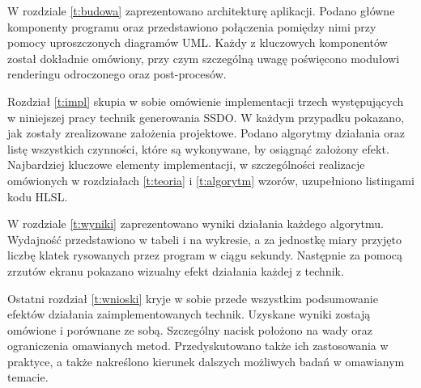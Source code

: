 	W rozdziale \ref{t:budowa} zaprezentowano architekturę aplikacji. Podano główne komponenty programu oraz przedstawiono połączenia pomiędzy nimi przy pomocy uproszczonych diagramów UML. Każdy z kluczowych komponentów został dokładnie omówiony, przy czym szczególną uwagę poświęcono modułowi renderingu odroczonego oraz post-procesów.
	
	Rozdział \ref{t:impl} skupia w sobie omówienie implementacji trzech występujących w niniejszej pracy technik generowania SSDO. W każdym przypadku pokazano, jak zostały zrealizowane założenia projektowe. Podano algorytmy działania oraz listę wszystkich czynności, które są wykonywane, by osiągnąć założony efekt. Najbardziej kluczowe elementy implementacji, w szczególności realizacje omówionych w rozdziałach \ref{t:teoria} i \ref{t:algorytm} wzorów, uzupełniono listingami kodu HLSL.
	
	W rozdziale \ref{t:wyniki} zaprezentowano wyniki działania każdego algorytmu. Wydajność przedstawiono w tabeli i na wykresie, a za jednostkę miary przyjęto liczbę klatek rysowanych przez program w ciągu sekundy. Następnie za pomocą zrzutów ekranu pokazano wizualny efekt działania każdej z technik.
	
	Ostatni rozdział \ref{t:wnioski} kryje w sobie przede wszystkim podsumowanie efektów działania zaimplementowanych technik. Uzyskane wyniki zostają omówione i porównane ze sobą. Szczególny nacisk położono na wady oraz ograniczenia omawianych metod. Przedyskutowano także ich zastosowania w praktyce, a także nakreślono kierunek dalszych możliwych badań w omawianym temacie.